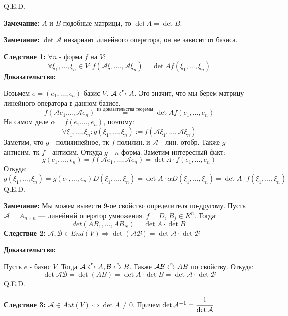 \hfill Q.E.D.

\textbf{Замечание:} $A$ и $B$ подобные матрицы, то $\det A = \det B$. 

\textbf{Замечание:} $\det \mathcal{A}$ \uline{инвариант} линейного оператора, он не зависит от базиса.

\textbf{Следствие 1:} $\forall n$ - форма $f$ на $V$:
$$\forall \xi_1,\ldots, \xi_n \in V: f(\mathcal{A}\xi_1.\ldots, \mathcal{A}\xi_n) =\det A f(\xi_1,\ldots, \xi_n)$$
\textbf{Доказательство:}

Возьмем $e = (e_1,\ldots,e_n)$ базис $V$. $\mathcal{A} \xleftrightarrow{e}A$. Это значит, что мы берем матрицу линейного оператора в данном базисе.
$$f(\mathcal{A}e_1.\ldots, \mathcal{A}e_n) \overset{\text{из доказательства теоремы}}{=}\det Af(e_1,\ldots,e_n)$$
На самом деле $\alpha = f(e_1.\ldots,e_n)$, поэтому:
$$\forall \xi_1,\ldots,\xi_n : g(\xi_1,\ldots,\xi_n):= f(\mathcal{A}\xi_1,\ldots, \mathcal{A} \xi_n)$$
Заметим, что $g$ - полилинейное, тк $f$ полилин. и $\mathcal{A}$ - лин. отобр. Также $g$ - антисим, тк $f$ - антисим. Откуда $g$ - $n$-форма. Заметим интересный факт:
$$g(e_1,\ldots,e_n) = f(\mathcal{A}e_1,\ldots,\mathcal{A}e_n) = \det A \cdot f(e_1,\ldots,e_n)$$
Откуда:
$$ g(\xi_1,\ldots,\xi_n)= g(e_1,\ldots,e_n) D(\xi_1,\ldots,\xi_n) = \det A  \cdot \alpha D(\xi_1,\ldots,\xi_n) = \det A \cdot f(\xi_1,\ldots,\xi_n)$$
\hfill Q.E.D.

\textbf{Замечание:} Мы можем вывести 9-ое свойство определителя по-другому. Пусть $\mathcal{A} = A_{n\times n}$ --- линейный оператор умножения.
$f = D$, $B_j \in K^n$. Тогда:
$$det(AB_1,\ldots, AB_N) = \det A \cdot \det B $$
\textbf{Следствие 2:}
$\mathcal{A},\mathcal{B} \in End(V) \Rightarrow \det(\mathcal{A} \mathcal{B}) = \det \mathcal{A} \cdot \det \mathcal{B}$

\textbf{Доказательство:}

Пусть $e$ - базис $V$. Тогда $\mathcal{A} \xleftrightarrow{e}A, \mathcal{B}\xleftrightarrow{e}B$. Также $\mathcal{A}\mathcal{B} \xleftrightarrow{e}AB$ по свойству. Откуда:
$$\det \mathcal{A}\mathcal{B} = \det(AB) = \det A \cdot \det B = \det \mathcal{A} \cdot \det\mathcal{B}$$
\hfill Q.E.D.

\textbf{Следствие 3:} $\mathcal{A} \in Aut(V) \Leftrightarrow \det A \neq 0$. Причем $\det \mathcal{A}^{-1} = \cfrac{1}{\det \mathcal{A}}$

